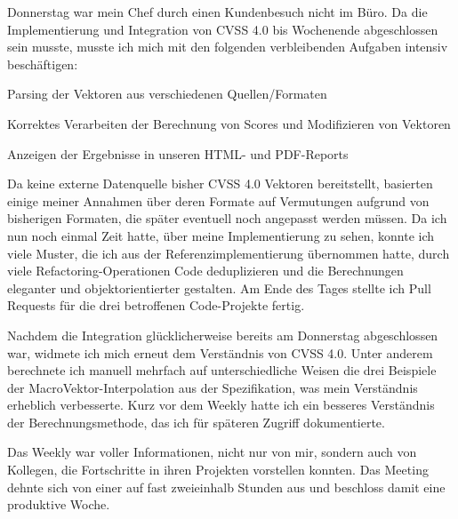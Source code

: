 
Donnerstag war mein Chef durch einen Kundenbesuch nicht im Büro.
Da die Implementierung und Integration von CVSS 4.0 bis Wochenende abgeschlossen sein musste, musste ich mich mit den folgenden verbleibenden Aufgaben intensiv beschäftigen:

\begin{smitemize}
    \item Parsing der Vektoren aus verschiedenen Quellen/Formaten
    \item Korrektes Verarbeiten der Berechnung von Scores und Modifizieren von Vektoren
    \item Anzeigen der Ergebnisse in unseren HTML- und PDF-Reports
\end{smitemize}

Da keine externe Datenquelle bisher CVSS 4.0 Vektoren bereitstellt, basierten einige meiner Annahmen über deren Formate auf Vermutungen aufgrund von bisherigen Formaten, die später eventuell noch angepasst werden müssen.
Da ich nun noch einmal Zeit hatte, über meine Implementierung zu sehen, konnte ich viele Muster, die ich aus der Referenzimplementierung übernommen hatte, durch viele Refactoring-Operationen Code deduplizieren und die Berechnungen eleganter und objektorientierter gestalten.
Am Ende des Tages stellte ich Pull Requests für die drei betroffenen Code-Projekte fertig.


Nachdem die Integration glücklicherweise bereits am Donnerstag abgeschlossen war, widmete ich mich erneut dem Verständnis von CVSS 4.0.
Unter anderem berechnete ich manuell mehrfach auf unterschiedliche Weisen die drei Beispiele der MacroVektor-Interpolation aus der Spezifikation, was mein Verständnis erheblich verbesserte.
Kurz vor dem Weekly hatte ich ein besseres Verständnis der Berechnungsmethode, das ich für späteren Zugriff dokumentierte.

Das Weekly war voller Informationen, nicht nur von mir, sondern auch von Kollegen, die Fortschritte in ihren Projekten vorstellen konnten.
Das Meeting dehnte sich von einer auf fast zweieinhalb Stunden aus und beschloss damit eine produktive Woche.
